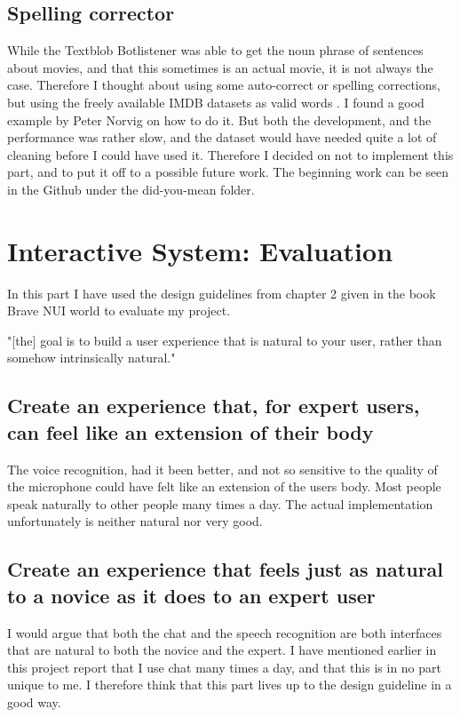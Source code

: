 \documentclass[11pt,fleqn]{book} %
\begin{document}
\section{Spelling corrector}
While the Textblob Botlistener was able to get the noun phrase\cite{WikipediaNounPhrase} of sentences about movies, and that this sometimes is an actual movie, it is not always the case. Therefore I thought about using some auto-correct or spelling corrections, but using the freely available IMDB datasets as valid words \cite{IMDbAlternativeInterfaces}. I found a good example by Peter Norvig \cite{NorvigHowCorrector} on how to do it.
But both the development, and the performance was rather slow, and the dataset would have needed quite a lot of cleaning before I could have used it. Therefore I decided on not to implement this part, and to put it off to a possible future work. The beginning work can be seen in the Github\cite{Github2017GitHubProject} under the did-you-mean folder.


\chapter{Interactive System: Evaluation}
In this part I have used the design guidelines from chapter 2 given in the book Brave NUI\cite{Wigdor2010BraveWorld} world to evaluate my project.

"[the] goal is to build a user experience
that is natural to your user, rather than somehow intrinsically natural\cite{Wigdor2010BraveWorld}."

\section{Create an experience that, for expert users, can feel like an extension of their
body}
The voice recognition, had it been better, and not so sensitive to the quality of the microphone could have felt like an extension of the users body. Most people speak naturally to other people many times a day. The actual implementation unfortunately is neither natural nor very good.

\section{Create an experience that feels just as natural to a novice as it does to an
expert user}
I would argue that both the chat and the speech recognition are both interfaces that are natural to both the novice and the expert. I have mentioned earlier in this project report that I use chat many times a day, and that this is in no part unique to me. I therefore think that this part lives up to the design guideline in a good way.
\end{document}
